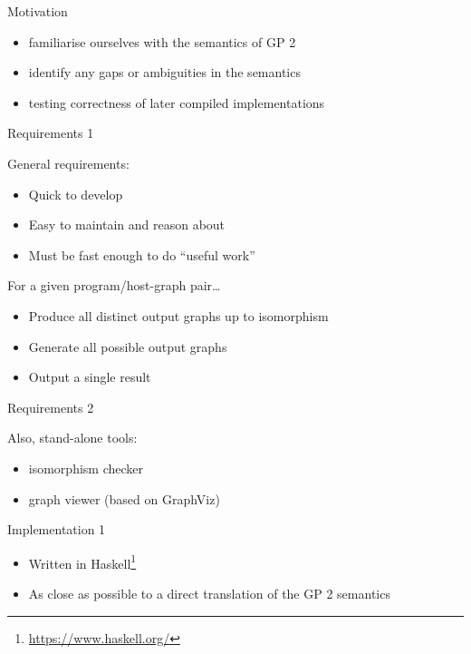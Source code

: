 \begin{frame}{Motivation}

\begin{itemize}
\itemsep1pt\parskip0pt
\item
  familiarise ourselves with the semantics of GP 2
\item
  identify any gaps or ambiguities in the semantics
\item
  testing correctness of later compiled implementations
\end{itemize}

\end{frame}

\begin{frame}{Requirements 1}

General requirements:

\begin{itemize}
\itemsep1pt\parskip0pt
\item
  Quick to develop 
\item
  Easy to maintain and reason about
\item
  Must be fast enough to do ``useful work''
\end{itemize}

\pause

For a given program/host-graph pair\ldots{}

\begin{itemize}
\itemsep1pt\parskip0pt
\item
  Produce all distinct output graphs up to isomorphism 
\item
  Generate all possible output graphs 
\item
  Output a single result 
\end{itemize}

\end{frame}

\begin{frame}{Requirements 2}

Also, stand-alone tools:

\begin{itemize}
\itemsep1pt\parskip0pt
\item
  isomorphism checker
\item
  graph viewer (based on GraphViz)
\end{itemize}

\end{frame}

\begin{frame}{Implementation 1}

\begin{itemize}
\itemsep1pt\parskip0pt
\item
  Written in Haskell\footnote{\url{https://www.haskell.org/}}
\item
  As close as possible to a direct translation of the GP 2 semantics
\end{itemize}



\end{frame}

